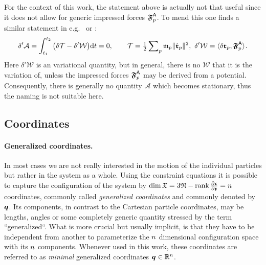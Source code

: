 For the context of this work, the statement above is actually not that useful since it does not allow for generic impressed forces $\particleForceImpressed{\PidxI}$.
To mend this one finds a similar statement in e.g.\ \cite[eq.\,12.2.14]{Lurie:AnalyticalMechanics} or \cite[sec.\ I.3]{Szabo:HM}:
\begin{align}\label{eq:HamiltonPrinciple}
 \delta'\mathcal{A} = \int_{t_1}^{t_2} \big( \delta \kineticEnergy - \delta'\mathcal{W} \big) \d t = 0, 
\qquad
 \kineticEnergy = \tfrac{1}{2} \sumParticles \particleMass{\PidxI} \norm{\particlePosd{\PidxI}}^2, \ \delta'\mathcal{W} = \sProd{\delta \particlePos{\PidxI}}{\particleForceImpressed{\PidxI}}.
\end{align}
Here $\delta'\mathcal{W}$ is an variational quantity, but in general, there is no $\mathcal{W}$ that it is the variation of, unless the impressed forces $\particleForceImpressed{\PidxI}$ may be derived from a potential.
Consequently, there is generally no quantity $\mathcal{A}$ which becomes stationary, thus the naming is not suitable here.

\subsection{Coordinates}
\paragraph{Generalized coordinates.} 
In most cases we are not really interested in the motion of the individual particles but rather in the system as a whole.
Using the constraint equations it is possible to capture the configuration of the system by $\dim\particleConfigSpace = 3\numParticles - \rank\pdiff[\particleGeoConstraint]{\particleCoord} = \dimConfigSpace$ coordinates, commonly called \textit{generalized coordinates} and commonly denoted by $\genCoord$.
Its components, in contrast to the Cartesian particle coordinates, may be lengths, angles or some completely generic quantity stressed by the term ``generalized``.
What is more crucial but usually implicit, is that they have to be independent from another to parameterize the $\dimConfigSpace$ dimensional configuration space with its $\dimConfigSpace$ components.
Whenever used in this work, these coordinates are referred to as \textit{minimal} generalized coordinates $\genCoord\in\RealNum^\dimConfigSpace$.

